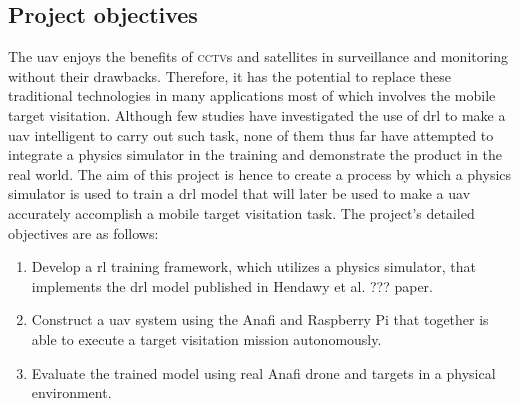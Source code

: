 \documentclass[../main.tex]{subfiles}
\begin{document}

\blindtext

\subsection{Project objectives}

The \gls{uav} enjoys the benefits of \textsc{cctv}s and satellites
in surveillance and monitoring without their drawbacks.
Therefore, it has the potential to replace these
traditional technologies in many applications 
most of which involves the mobile target visitation. 
Although few studies have investigated the use of \gls{drl}
to make a \gls{uav} intelligent to carry out such task,
none of them thus far have attempted to
integrate a physics simulator in the training
and demonstrate the product in the real world.
The aim of this project is hence to create a process 
by which a physics simulator is used to train 
a \gls{drl} model that will later be used
to make a \gls{uav} accurately accomplish a
mobile target visitation task.
The project's detailed objectives are as follows:
\begin{enumerate}
    \item Develop a \gls{rl} training framework,
        which utilizes a physics simulator, 
        that implements the \gls{drl} model 
        published in Hendawy et al. ??? paper.
    \item Construct a \gls{uav} system using the Anafi and 
        Raspberry Pi that together is able to execute
        a target visitation mission autonomously.
    \item Evaluate the trained model using real Anafi drone
        and targets in a physical environment.
\end{enumerate}
\end{document}
